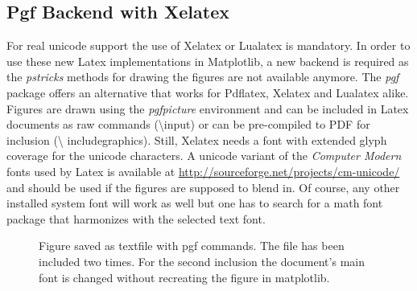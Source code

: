 \documentclass[12pt, a4paper]{article}
\begin{document}
\newpage
\subsection*{Pgf Backend with Xelatex}
For real unicode support the use of Xelatex or Lualatex is mandatory. In order to use these new Latex implementations in Matplotlib, a new backend is required as the \textit{pstricks} methods for drawing the figures are not available anymore. The \textit{pgf} package offers an alternative that works for Pdflatex, Xelatex and Lualatex alike. Figures are drawn using the \textit{pgfpicture} environment and can be included in Latex documents as raw commands (\textbackslash input) or can be pre-compiled to PDF for inclusion (\textbackslash
 includegraphics). Still, Xelatex needs a font with extended glyph coverage for the unicode characters. A unicode variant of the \textit{Computer Modern} fonts used by Latex is available at \url{http://sourceforge.net/projects/cm-unicode/} and should be used if the figures are supposed to blend in. Of course, any other installed system font will work as well but one has to search for a math font package that harmonizes with the selected text font.


\begin{figure}[h]
\hspace{1mm}
{\setmainfont{Linux Biolinum O}
 }
\caption{Figure saved as textfile with pgf commands. The file has been included two times. For the second inclusion the document's main font is changed without recreating the figure in matplotlib.}
\end{figure}
\end{document}
